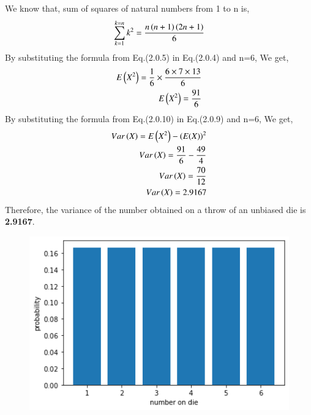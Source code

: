 \documentclass[journal,12pt,twocolumn]{IEEEtran}
\begin{document}
We know that, sum of squares of natural numbers from 1 to n is,
\begin{align}
\sum_{k=1}^{k=n} k^{2} = \frac{n\left(n+1\right)\left(2n+1\right)}{6}
\end{align}
By substituting the formula from Eq.(2.0.5) in Eq.(2.0.4) and n=6, We get,
\begin{align}
E\left(X^{2}\right)=\frac{1}{6} \times \frac{6\times7\times13}{6}\\
E\left(X^{2}\right)=\frac{91}{6}
\end{align}
By substituting the formula from Eq.(2.0.10) in Eq.(2.0.9) and n=6, We get,
\begin{align}
Var\left(X\right) = E\left(X^{2}\right)-\left(E(X)\right)^{2}\\
Var\left(X\right) = \frac{91}{6} - \frac{49}{4}\\
Var\left(X\right) = \frac{70}{12}\\
Var\left(X\right) = 2.9167
\end{align}
Therefore, the variance of the number obtained on a throw of an unbiased die is \textbf{2.9167}.
\newpage
\begin{figure}
    \centering
    \includegraphics[width=18cm]{Assignment_2.png}
\end{figure}
\end{document}
